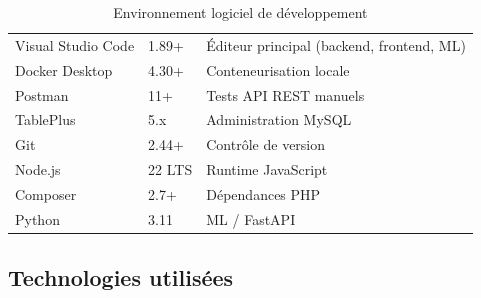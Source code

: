 \begin{table}[H]
  \centering
  \caption{Environnement logiciel de développement}
  \label{tab:env_logiciel}
  \begin{tabularx}{\textwidth}{L{4cm}L{2.5cm}X}
    \toprule
     &  &  \\
    \midrule
    Visual Studio Code & 1.89+   & Éditeur principal (backend, frontend, ML) \\
    Docker Desktop     & 4.30+   & Conteneurisation locale \\
    Postman            & 11+     & Tests API REST manuels \\
    TablePlus          & 5.x     & Administration MySQL \\
    Git                & 2.44+   & Contrôle de version \\
    Node.js            & 22 LTS  & Runtime JavaScript \\
    Composer           & 2.7+    & Dépendances PHP \\
    Python             & 3.11    & ML / FastAPI \\
    \bottomrule
  \end{tabularx}
\end{table}

\subsection{Technologies utilisées}

